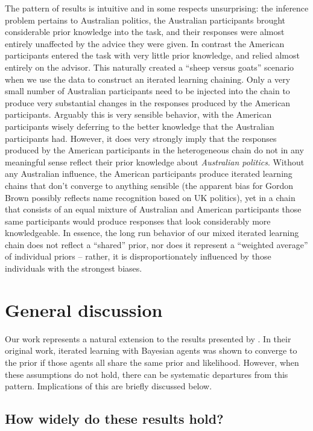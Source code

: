 \documentclass[doc]{apa6}
\begin{document}
The pattern of results is intuitive and in some respects unsurprising: the inference problem pertains to Australian politics, the Australian participants brought considerable prior knowledge into the task, and their responses were almost entirely unaffected by the advice they were given. In contrast the American participants entered the task with very little prior knowledge, and relied almost entirely on the advisor. This naturally created a ``{\sc sheep} versus {\sc goats}'' scenario when we use the data to construct an iterated learning chaining. Only a very small number of Australian participants need to be injected into the chain to produce very substantial changes in the responses produced by the American participants. Arguably this is very sensible behavior, with the American participants wisely deferring to the better knowledge that the Australian participants had. However, it does very strongly imply that the responses produced by the American participants in the heterogeneous chain do not in any meaningful sense reflect their prior knowledge about {\it Australian politics}. Without any Australian influence, the American participants produce iterated learning chains that don't converge to anything sensible (the apparent bias for Gordon Brown possibly reflects name recognition based on UK politics), yet in a chain that consists of an equal mixture of Australian and American participants those same participants would produce responses that look considerably more knowledgeable. In essence, the long run behavior of our mixed iterated learning chain does not reflect a ``shared'' prior, nor does it represent a ``weighted average'' of individual priors -- rather, it is disproportionately influenced by those individuals with the strongest biases.



\section{General discussion}

Our work represents a natural extension to the  results presented by \textcite{griffiths_language_2007}. In their original work, iterated learning with Bayesian agents was shown to converge to the prior if those agents all share the same prior and likelihood. However, when these assumptions do not hold, there can be systematic departures from this pattern. Implications of this are briefly discussed below.

\subsection{How widely do these results hold?}
\end{document}
